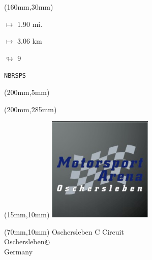 \begin{textblock*}{40mm}(160mm,30mm)%
\Large
\par$\mapsto$ 1.90 mi.
\par$\mapsto$ 3.06 km
\par$\looparrowright$ 9
\par\hfill\tiny\tt NBRSPS\\
\end{textblock*}
\begin{textblock*}{20mm}(200mm,5mm)%
\fbox{\thepage}
\label{NBRSPS}
\end{textblock*}
\begin{textblock*}{20mm}(200mm,285mm)%
\fbox{\thepage}
\end{textblock*}

\null\newpage
\begin{textblock*}{50mm}(15mm,10mm)%
\includegraphics[width=50mm]{LG/2015-05-20_00090.png}
\end{textblock*}
\begin{textblock*}{130mm}(70mm,10mm)%
{\fontsize{20}{20}\selectfont Oschersleben C Circuit\\}
{\fontsize{16}{16}\selectfont Oschersleben\hfill \Large$\circlearrowright$\\}
{\fontsize{12}{12}\selectfont Germany\\}
\end{textblock*}
